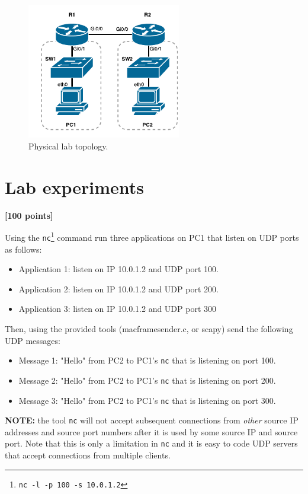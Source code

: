 \documentclass[pdftex,12pt,a4paper]{article}
\begin{document}
        \begin{figure}[tbh]
            \centering
            \includegraphics[width=0.6\textwidth]{figures/labtop}
            \caption{Physical lab topology.}
            \label{fig:labtop}
        \end{figure}

    \section{Lab experiments}
        \begin{flushright}
            \textbf{[100 points]}
        \end{flushright}

        Using the \texttt{nc}\footnote{\texttt{nc -l -p 100 -s 10.0.1.2}}
        command run three applications on PC1 that listen on UDP ports as
        follows:
        \begin{itemize}
            \item Application 1: listen on IP 10.0.1.2 and UDP port 100.
            \item Application 2: listen on IP 10.0.1.2 and UDP port 200.
            \item Application 3: listen on IP 10.0.1.2 and UDP port 300
        \end{itemize}

        Then, using the provided tools (macframesender.c, or scapy) send the
        following UDP messages:
        \begin{itemize}
            \item Message 1: "Hello" from PC2 to PC1's \texttt{nc} that is
                listening on port 100.
            \item Message 2: "Hello" from PC2 to PC1's \texttt{nc} that is
                listening on port 200.
            \item Message 3: "Hello" from PC2 to PC1's \texttt{nc} that is
                listening on port 300.
        \end{itemize}

        \textbf{NOTE:} the tool \texttt{nc} will not accept subsequent
        connections from \emph{other} source IP addresses and source port
        numbers after it is used by some source IP and source port. Note that
        this is only a limitation in \texttt{nc} and it is easy to code UDP
        servers that accept connections from multiple clients.
\end{document}
